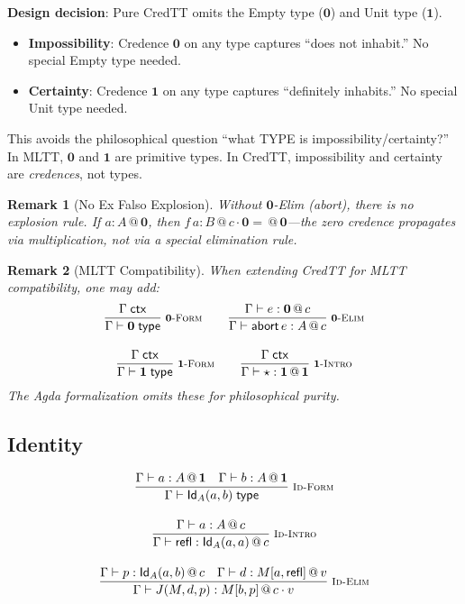 \documentclass[11pt,a4paper]{article}
\makeatletter
\newcommand{\infer}[3][]{%
  \genfrac{}{}{0.4pt}{0}{#3}{#2}\;\textsc{\footnotesize #1}%
}
\newtheorem{remark}{Remark}[section]
\newcommand{\ctx}{\;\mathsf{ctx}}
\newcommand{\type}{\;\mathsf{type}}
\newcommand{\at}[1]{\,@\,#1}
\newcommand{\one}{\mathbf{1}}
\newcommand{\zero}{\mathbf{0}}
\makeatother
\begin{document}
\textbf{Design decision}: Pure CredTT omits the Empty type ($\mathbf{0}$) and Unit type ($\mathbf{1}$).

\begin{itemize}
    \item \textbf{Impossibility}: Credence $\zero$ on any type captures ``does not inhabit.'' No special Empty type needed.
    \item \textbf{Certainty}: Credence $\one$ on any type captures ``definitely inhabits.'' No special Unit type needed.
\end{itemize}

This avoids the philosophical question ``what TYPE is impossibility/certainty?'' In MLTT, $\mathbf{0}$ and $\mathbf{1}$ are primitive types. In CredTT, impossibility and certainty are \emph{credences}, not types.

\begin{remark}[No Ex Falso Explosion]
Without $\mathbf{0}$-Elim (abort), there is no explosion rule. If $a : A \at{\zero}$, then $f\,a : B \at{c \cdot \zero} = \at{\zero}$---the zero credence propagates via multiplication, not via a special elimination rule.
\end{remark}

\begin{remark}[MLTT Compatibility]
When extending CredTT for MLTT compatibility, one may add:
\begin{gather*}
\infer[\textsc{$\mathbf{0}$-Form}]
  {\Gamma \vdash \mathbf{0} \type}
  {\Gamma \ctx}
\qquad
\infer[\textsc{$\mathbf{0}$-Elim}]
  {\Gamma \vdash \mathsf{abort}\,e : A \at{c}}
  {\Gamma \vdash e : \mathbf{0} \at{c}}
\\[1em]
\infer[\textsc{$\mathbf{1}$-Form}]
  {\Gamma \vdash \mathbf{1} \type}
  {\Gamma \ctx}
\qquad
\infer[\textsc{$\mathbf{1}$-Intro}]
  {\Gamma \vdash \star : \mathbf{1} \at{\one}}
  {\Gamma \ctx}
\end{gather*}
The Agda formalization omits these for philosophical purity.
\end{remark}

\subsection{Identity}

\begin{gather}
\infer[\textsc{Id-Form}]
  {\Gamma \vdash \mathsf{Id}_A(a, b) \type}
  {\Gamma \vdash a : A \at{\one} \quad \Gamma \vdash b : A \at{\one}}
\\[1em]
\infer[\textsc{Id-Intro}]
  {\Gamma \vdash \mathsf{refl} : \mathsf{Id}_A(a, a) \at{c}}
  {\Gamma \vdash a : A \at{c}}
\\[1em]
\infer[\textsc{Id-Elim}]
  {\Gamma \vdash J(M, d, p) : M[b, p] \at{c \cdot v}}
  {\Gamma \vdash p : \mathsf{Id}_A(a, b) \at{c} \quad \Gamma \vdash d : M[a, \mathsf{refl}] \at{v}}
\end{gather}
\end{document}
